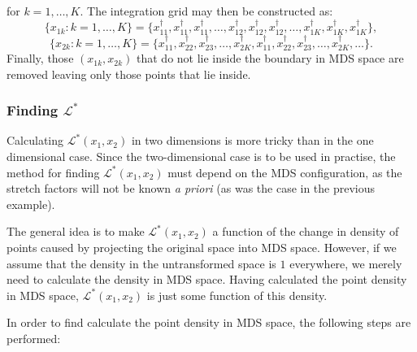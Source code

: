 for $k=1,\dots,K$. The integration grid may then be constructed as:
\begin{equation*}
\{x_{1k} : k=1,\dots,K\} = \{x^\dagger_{11},x^\dagger_{11},x^\dagger_{11},\dots, x^\dagger_{12}, x^\dagger_{12}, x^\dagger_{12},\dots, x^\dagger_{1K}, x^\dagger_{1K}, x^\dagger_{1K}\},
\end{equation*}
\begin{equation*}
\{x_{2k} : k=1,\dots,K\} = \{x^\dagger_{11},x^\dagger_{22}, x^\dagger_{23},\dots, x^\dagger_{2K},x^\dagger_{11},x^\dagger_{22}, x^\dagger_{23},\dots, x^\dagger_{2K},\dots\}.
\end{equation*}
Finally, those $(x_{1k},x_{2k})$ that do not lie inside the boundary in MDS space are removed leaving only those points that lie inside.

\subsubsection{Finding $\mathcal{L}^*$}

Calculating $\mathcal{L}^*(x_1,x_2)$ in two dimensions is more tricky than in the one dimensional case. Since the two-dimensional case is to be used in practise, the method for finding $\mathcal{L}^*(x_1,x_2)$ must depend on the MDS configuration, as the stretch factors will not be known \emph{a priori} (as was the case in the previous example).

The general idea is to make $\mathcal{L}^*(x_1,x_2)$ a function of the change in density of points caused by projecting the original space into MDS space. However, if we assume that the density in the untransformed space is $1$ everywhere, we merely need to calculate the density in MDS space. Having calculated the point density in MDS space, $\mathcal{L}^*(x_1,x_2)$ is just some function of this density.

In order to find calculate the point density in MDS space, the following steps are performed:

